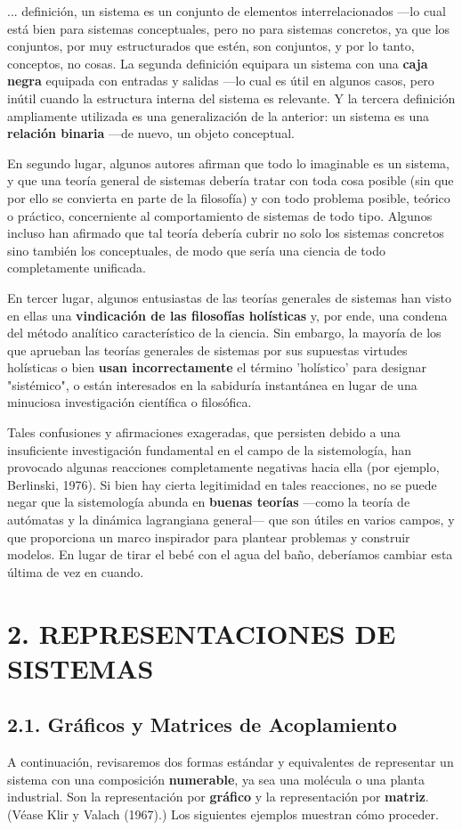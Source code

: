 {\fontsize{13}{15}\selectfont
... definición, un sistema es un conjunto de elementos interrelacionados —lo cual está bien para sistemas conceptuales, pero no para sistemas concretos, ya que los conjuntos, por muy estructurados que estén, son conjuntos, y por lo tanto, conceptos, no cosas. La segunda definición equipara un sistema con una \textbf{caja negra} equipada con entradas y salidas —lo cual es útil en algunos casos, pero inútil cuando la estructura interna del sistema es relevante. Y la tercera definición ampliamente utilizada es una generalización de la anterior: un sistema es una \textbf{relación binaria} —de nuevo, un objeto conceptual.

En segundo lugar, algunos autores afirman que todo lo imaginable es un sistema, y que una teoría general de sistemas debería tratar con toda cosa posible (sin que por ello se convierta en parte de la filosofía) y con todo problema posible, teórico o práctico, concerniente al comportamiento de sistemas de todo tipo. Algunos incluso han afirmado que tal teoría debería cubrir no solo los sistemas concretos sino también los conceptuales, de modo que sería una ciencia de todo completamente unificada.

En tercer lugar, algunos entusiastas de las teorías generales de sistemas han visto en ellas una \textbf{vindicación de las filosofías holísticas} y, por ende, una condena del método analítico característico de la ciencia. Sin embargo, la mayoría de los que aprueban las teorías generales de sistemas por sus supuestas virtudes holísticas o bien \textbf{usan incorrectamente} el término 'holístico' para designar "sistémico", o están interesados en la sabiduría instantánea en lugar de una minuciosa investigación científica o filosófica.

Tales confusiones y afirmaciones exageradas, que persisten debido a una insuficiente investigación fundamental en el campo de la sistemología, han provocado algunas reacciones completamente negativas hacia ella (por ejemplo, Berlinski, 1976). Si bien hay cierta legitimidad en tales reacciones, no se puede negar que la sistemología abunda en \textbf{buenas teorías} —como la teoría de autómatas y la dinámica lagrangiana general— que son útiles en varios campos, y que proporciona un marco inspirador para plantear problemas y construir modelos. En lugar de tirar el bebé con el agua del baño, deberíamos cambiar esta última de vez en cuando.

\section*{\textbf{2. REPRESENTACIONES DE SISTEMAS}}

\subsection*{2.1. Gráficos y Matrices de Acoplamiento}
A continuación, revisaremos dos formas estándar y equivalentes de representar un sistema con una composición \textbf{numerable}, ya sea una molécula o una planta industrial. Son la representación por \textbf{gráfico} y la representación por \textbf{matriz}. (Véase Klir y Valach (1967).) Los siguientes ejemplos muestran cómo proceder.
}

